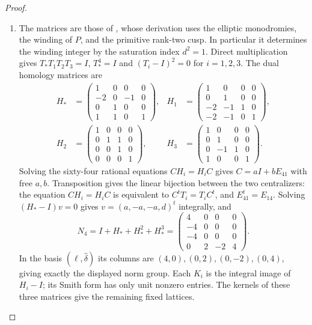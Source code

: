 \begin{proof}
\begin{enumerate}[leftmargin=*]
\item The matrices are those of \citet[Proposition~4.2]{ViaTwo26push}, whose
derivation uses the elliptic monodromies, the winding of $P$,
and the primitive rank-two cusp.  In particular it determines
the winding integer by the saturation index $d^2=1$.  Direct multiplication gives
$T_*T_1T_2T_3=I$, $T_*^4=I$ and
$(T_i-I)^2=0$ for $i=1,2,3$.
The dual homology matrices are
\[
\begin{aligned}
 H_*&=\begin{pmatrix}1&0&0&0\\-2&0&-1&0\\0&1&0&0\\1&1&0&1\end{pmatrix},&
 H_1&=\begin{pmatrix}1&0&0&0\\0&1&0&0\\-2&-1&1&0\\-2&-1&0&1\end{pmatrix},\\
 H_2&=\begin{pmatrix}1&0&0&0\\0&1&1&0\\0&0&1&0\\0&0&0&1\end{pmatrix},&
 H_3&=\begin{pmatrix}1&0&0&0\\0&1&0&0\\0&-1&1&0\\1&0&0&1\end{pmatrix}.
\end{aligned}
\]
Solving the sixty-four rational equations $CH_i=H_iC$
gives $C=aI+bE_{41}$ with free $a,b$. Transposition gives the
linear bijection between the two centralizers: the equation
$CH_i=H_iC$ is equivalent to $C^tT_i=T_iC^t$, and
$E_{41}^t=E_{14}$.  Solving $(H_*-I)v=0$ gives
$v=(a,-a,-a,d)^t$ integrally, and
\[
 N_4=I+H_*+H_*^2+H_*^3
 =\begin{pmatrix}4&0&0&0\\-4&0&0&0\\-4&0&0&0\\0&2&-2&4\end{pmatrix}.
\]
In the basis $(\ell,\widehat\delta)$ its columns are
$(4,0),(0,2),(0,-2),(0,4)$, giving exactly the displayed
norm group.  Each $K_i$ is the integral image of
$H_i-I$; its Smith form has only unit nonzero entries.
The kernels of these three matrices give the remaining fixed
lattices.

\end{enumerate}
\end{proof}